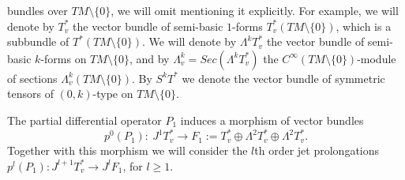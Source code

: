 bundles over $TM\setminus\{0\}$, we will omit mentioning it
explicitly. For example, we will denote by $T^*_v$ the vector
bundle of semi-basic $1$-forms $T^*_v(TM\setminus\{0\})$, which is
a subbundle of $T^*(TM\setminus\{0\})$. We will denote by
$\Lambda^kT^*_v$ the vector bundle of semi-basic $k$-forms on
$TM\setminus\{0\}$, and by
$\Lambda^k_v=Sec\left(\Lambda^kT^*_v\right)$ the
$C^{\infty}(TM\setminus\{0\})$-module of sections $\Lambda^k_v(TM\setminus\{0\})$. By $S^kT^*$ we denote the vector
bundle of symmetric tensors of $(0,k)$-type on $TM\setminus\{0\}$.

The partial dif\/ferential operator $P_1$ induces a morphism of vector
bundles
\[
 p^0(P_1): \ J^1T^*_v \to F_1:=T^*_v \oplus \Lambda^2 T^*_v \oplus
\Lambda^2 T^*_v.
\] Together with this morphism we will consider the $l$th order jet prolongations $p^l(P_1):
J^{l+1}T^*_v \to J^{l}F_1$, for $l\geq 1$.

